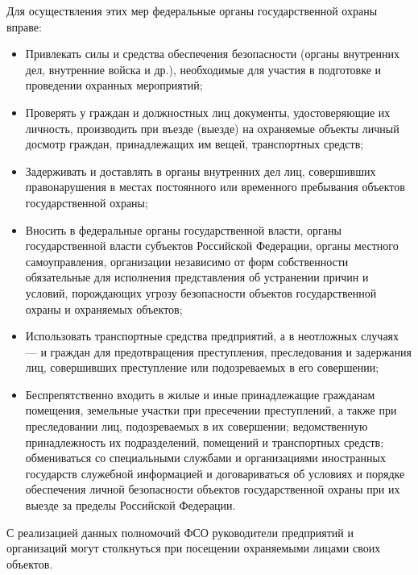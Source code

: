 \documentclass[a4paper,12pt,fleqn]{article} %
\begin{document}
Для осуществления этих мер федеральные органы государственной охраны вправе:

\begin{itemize}
	\item Привлекать силы и средства обеспечения безопасности (органы внутренних дел, внутренние войска и др.), необходимые для участия в подготовке и проведении охранных мероприятий; 
	\item Проверять у граждан и должностных лиц документы, удостоверяющие их личность, производить при въезде (выезде) на охраняемые объекты личный досмотр граждан, принадлежащих им вещей, транспортных средств; 
	\item Задерживать и доставлять в органы внутренних дел лиц, совершивших правонарушения в местах постоянного или временного пребывания объектов государственной охраны; 
	\item Вносить в федеральные органы государственной власти, органы государственной власти субъектов Российской Федерации, органы местного самоуправления, организации независимо от форм собственности обязательные для исполнения представления об устранении причин и условий, порождающих угрозу безопасности объектов государственной охраны и охраняемых объектов; 
	\item Использовать транспортные средства предприятий, а в неотложных случаях --- и граждан для предотвращения преступления, преследования и задержания лиц, совершивших преступление или подозреваемых в его совершении; 
	\item Беспрепятственно входить в жилые и иные принадлежащие гражданам помещения, земельные участки при пресечении преступлений, а также при преследовании лиц, подозреваемых в их совершении; ведомственную принадлежность их подразделений, помещений и транспортных средств; обмениваться со специальными службами и организациями иностранных государств служебной информацией и договариваться об условиях и порядке обеспечения личной безопасности объектов государственной охраны при их выезде за пределы Российской Федерации.
\end{itemize}

С реализацией данных полномочий ФСО руководители предприятий и организаций могут столкнуться при посещении охраняемыми лицами своих объектов. 
\end{document}
